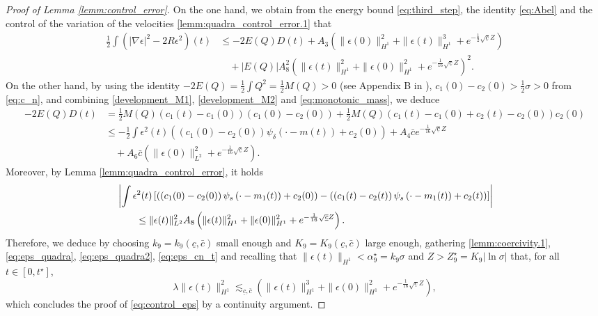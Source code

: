 \documentclass[reqno,10pt]{amsart}
\numberwithin{equation}{section}
\begin{document}
	\begin{proof}[Proof of Lemma \ref{lemm:control_error}]
		On the one hand, we obtain from the energy bound \eqref{eq:third_step}, the identity \eqref{eq:Abel} and the control of the variation of the velocities \eqref{lemm:quadra_control_error.1} that
		\begin{align}
			\frac12 \int \left( \vert \nabla \epsilon \vert^2 - 2 R \epsilon^2 \right)(t) & \leq - 2 E(Q) D(t) + A_3 \left( \| \epsilon (0) \|_{H^1}^2 + \| \epsilon(t) \|_{H^1}^3 + e^{-\frac12 \sqrt{\underline{c}} Z} \right) \nonumber\\
                & \quad + \left\vert E(Q) \right\vert A_8^2 \left( \| \epsilon(t) \|_{H^1}^2 + \| \epsilon (0) \|_{H^1}^2 +  e^{-\frac1{16} \sqrt{\underline{c}} Z} \right)^2. \label{eq:eps_quadra}
		\end{align}
		On the other hand, by using the identity $-2E(Q)= \frac12\int Q^2= \frac12 M(Q)>0$ (see Appendix B in \cite{CMPS16}), $c_1(0)-c_2(0)>\frac12 \sigma >0$ from \eqref{eq:c_n}, and combining \eqref{development_M1}, \eqref{development_M2} and \eqref{eq:monotonic_mass}, we deduce
		\begin{align}
			- 2 E(Q)D(t) & = \frac12 M(Q) \left(c_1(t)-c_1(0) \right) \left(c_1(0)-c_2(0)\right)+ \frac12 M(Q)\left(c_1(t)-c_1(0)+c_2(t)-c_2(0) \right)  c_2(0) \nonumber \\
			& \leq - \frac12 \int \epsilon^2(t) \left( (c_1(0) -c_2(0))  \psi_{\delta}(\cdot - m(t)) +c_2(0) \right) +  A_4  \bar{c} e^{-\frac1{16} \sqrt{\underline{c}} Z} \nonumber \\
            & \quad + A_6 \bar{c} \left( \| \epsilon(0) \|_{L^2}^2 + e^{-\frac1{16} \sqrt{\underline{c}} Z} \right) \label{eq:eps_quadra2}.
		\end{align}
		Moreover, by Lemma \ref{lemm:quadra_control_error}, it holds
		\begin{align}
			\MoveEqLeft
			\left\vert \int \epsilon^2(t) \left[ \left( \left( c_1(0)-c_2(0)\right) \psi_s \left( \cdot- m_1(t) \right) + c_2(0) \right) - \left( \left( c_1(t)-c_2(t)\right) \psi_s \left( \cdot- m_1(t) \right) + c_2(t) \right) \right] \right\vert \nonumber \\
			& \leq \| \epsilon(t) \|_{L^2}^2 A_8  \left( \| \epsilon(t) \|_{H^1}^2 + \| \epsilon (0) \|_{H^1}^2 + e^{-\frac1{16} \sqrt{\underline{c}} Z}\right).\label{eq:eps_cn_t}
		\end{align}
		Therefore, we deduce by choosing $k_9=k_9(\underline{c},\bar{c})$ small enough and $K_9=K_9(\underline{c},\bar{c})$ large enough, gathering \eqref{lemm:coercivity.1}, \eqref{eq:eps_quadra}, \eqref{eq:eps_quadra2}, \eqref{eq:eps_cn_t} and recalling that $\|\epsilon(t)\|_{H^1}<\alpha_9^{\star}=k_9\sigma$ and $Z>Z_9^{\star}=K_9|\ln \sigma|$   that, for all $t \in [0,t^{\star}]$, 
  \begin{equation*}
\lambda \|\epsilon(t) \|_{H^1}^2 \lesssim_{\underline{c},\bar{c}} \left(\|\epsilon(t)\|_{H^1}^3+\|\epsilon(0)\|_{H^1}^2+e^{-\frac1{16}\sqrt{\underline{c}}Z} \right), 
  \end{equation*}
  which concludes the proof of \eqref{eq:control_eps} by a continuity argument.
	\end{proof}
	
\end{document}
